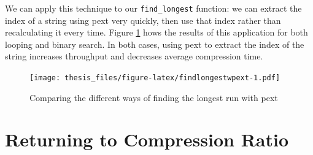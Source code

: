 \documentclass[12pt,twoside]{reedthesis}
\begin{document}
We can apply this technique to our \texttt{find\_longest} function: we can extract the index of a string using pext very quickly, then use that index rather than recalculating it every time. Figure \ref{fig:findlongestwpext} hows the results of this application for both looping and binary search. In both cases, using pext to extract the index of the string increases throughput and decreases average compression time.
\begin{figure}
\centering
\texttt{[image: thesis\_files/figure-latex/findlongestwpext-1.pdf]}
\caption{\label{fig:findlongestwpext}Comparing the different ways of finding the longest run with pext}
\end{figure}
\hypertarget{returning-to-compression-ratio}{%
\section{Returning to Compression Ratio}\label{returning-to-compression-ratio}}
\end{document}
